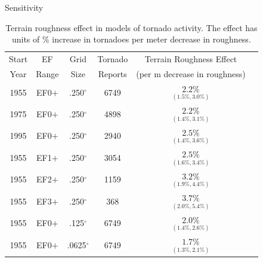 \documentclass[handout]{beamer}
\begin{document}
\begin{frame}{Sensitivity}
\begin{small}
\begin{table}
\begin{center}
\caption{Terrain roughness effect in models of tornado activity. The effect has units of \% increase in tornadoes per meter decrease in roughness.}
\begin{tabular}{cccccc} \hline
Start    & EF       & Grid   & Tornado & Terrain Roughness Effect            \\
Year     & Range    & Size   & Reports & (per m decrease in roughness)       \\ \hline
1955  & EF0$+$ & .250$^\circ$  & 6749  & $\underset{(1.5\%, 3.0\%)}{2.2\%}$ \\
\alert{1975}  & EF0$+$ & .250$^\circ$  & 4898  & $\underset{(1.4\%, 3.1\%)}{2.2\%}$ \\
\alert{1995}  & EF0$+$ & .250$^\circ$  & 2940  & $\underset{(1.4\%, 3.6\%)}{2.5\%}$ \\
1955  & \alert{EF1$+$} & .250$^\circ$  & 3054  & $\underset{(1.6\%, 3.4\%)}{2.5\%}$ \\
1955  & \alert{EF2$+$} & .250$^\circ$  & 1159  & $\underset{(1.9\%, 4.4\%)}{3.2\%}$ \\
1955  & \alert{EF3$+$} & .250$^\circ$  &  368  & $\underset{(2.0\%, 5.4\%)}{3.7\%}$ \\
1955  & EF0$+$ & \alert{.125$^\circ$}  & 6749  & $\underset{(1.4\%, 2.6\%)}{2.0\%}$ \\
1955  & EF0$+$ & \alert{.0625$^\circ$} & 6749  & $\underset{(1.3\%, 2.1\%)}{1.7\%}$ \\
\hline
\end{tabular}
\end{center}
\end{table}
\end{small}

\end{frame}
\end{document}
